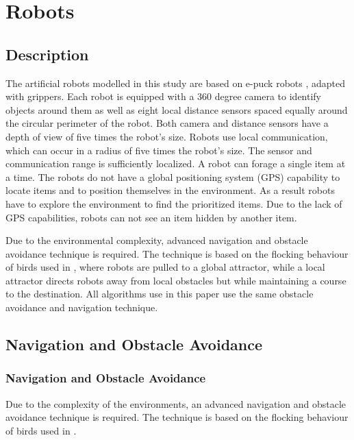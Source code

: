 
\chapter{Robots}
\label{chap:robots}


\section{Description}

The artificial robots modelled in this study are based on e-puck robots \cite{mondada2009puck}, adapted with grippers. Each robot is equipped with a 360 degree camera to identify objects around them as well as eight local distance sensors spaced equally around the circular perimeter of the robot. Both camera and distance sensors have a depth of view of five times the robot's size. Robots use local communication, which can occur in a radius of five times the robot's size. The sensor and communication range is sufficiently localized. A robot can forage a single item at a time. The robots do not have a global positioning system (GPS) capability to locate items and to position themselves in the environment. As a result robots have to explore the environment to find the prioritized items. Due to the lack of GPS capabilities, robots can not see an item hidden by another item.

Due to the environmental complexity, advanced navigation and obstacle avoidance technique is required. The technique is based on the flocking behaviour of birds used in \cite{antoniou2012congestion}, where robots are pulled to a global attractor, while a local attractor directs robots away from local obstacles but while maintaining a course to the destination. All algorithms use in this paper use the same obstacle avoidance and navigation technique. 

\section{Navigation and Obstacle Avoidance}
\label{robots:obstacleavoidance}

\subsection{Navigation and Obstacle Avoidance}
Due to the complexity of the environments, an advanced navigation and obstacle avoidance technique is required.  The technique is based on the flocking behaviour of birds used in \cite{antoniou2012congestion}.

